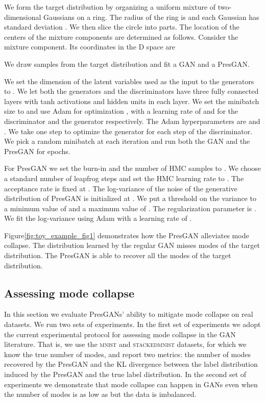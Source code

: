 \documentclass[11pt]{article}
\begin{document}
We form the target distribution by organizing a uniform mixture of  two-dimensional Gaussians on a ring. The radius of the ring is  and each Gaussian has standard deviation . We then slice the circle 
into  parts. The location of the centers of the mixture components are determined as follows. Consider the  mixture component. Its coordinates in the D space are

We draw  samples from the target distribution and fit a \gls{GAN} and a Pres\gls{GAN}.

We set the dimension of the latent variables  used as the input to the generators to . We let both the generators and the discriminators have three fully connected layers with tanh activations and  hidden units in each layer. We set the minibatch size to  and use Adam for optimization \citep{kingma2014adam}, with a learning rate of  and  for the discriminator and the generator respectively. The Adam hyperparameters are  and . We take one step to optimize the generator for each step of the discriminator. We pick a random minibatch at each iteration and run both the \gls{GAN} and the Pres\gls{GAN} for  epochs. 

For Pres\gls{GAN} we set the burn-in and the number of \gls{HMC} samples to . We choose a standard number of  leapfrog steps and set the \gls{HMC} learning rate to . The acceptance rate is fixed at . The log-variance of the noise of the generative distribution of Pres\gls{GAN} is initialized at . We put a threshold on the variance to a minimum value of  and a maximum value of . The regularization parameter  is . We fit the log-variance using Adam with a learning rate of . 

Figure\nobreakspace \ref {fig:toy_example_fig1} demonstrates how the Pres\gls{GAN} alleviates mode collapse. The distribution learned by the regular \gls{GAN} misses  modes of the target distribution. The Pres\gls{GAN} is able to recover all the modes of the target distribution. 

\subsection{Assessing mode collapse}
\label{subsec:assessing_mode_collapse}

In this section we evaluate Pres\glspl{GAN}' ability to mitigate mode collapse on real datasets. We run two sets of experiments. In the first set of experiments we adopt the current experimental protocol for assessing mode collapse in the \gls{GAN} literature. That is, we use the \textsc{mnist} and \textsc{stackedmnist} datasets, for which we know the true number of modes, and report two metrics: the number of modes recovered by the Pres\gls{GAN} and the \gls{KL} divergence between the label distribution induced by the Pres\gls{GAN} and the true label distribution. In the second set of experiments we demonstrate that mode collapse can happen in \glspl{GAN} even when the number of modes is as low as  but the data is imbalanced. 
\end{document}
